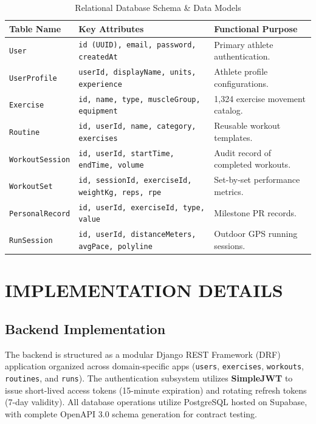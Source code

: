 \documentclass[12pt,a4paper]{report}
\begin{document}
\begin{table}[htbp]
\centering
\small
\renewcommand{\arraystretch}{1.25}
\begin{tabularx}{\textwidth}{|l|p{4.5cm}|X|}
\hline
\textbf{Table Name} & \textbf{Key Attributes} & \textbf{Functional Purpose} \\
\hline
\texttt{User} & \texttt{id (UUID), email, password, createdAt} & Primary athlete authentication. \\
\hline
\texttt{UserProfile} & \texttt{userId, displayName, units, experience} & Athlete profile configurations. \\
\hline
\texttt{Exercise} & \texttt{id, name, type, muscleGroup, equipment} & 1,324 exercise movement catalog. \\
\hline
\texttt{Routine} & \texttt{id, userId, name, category, exercises} & Reusable workout templates. \\
\hline
\texttt{WorkoutSession} & \texttt{id, userId, startTime, endTime, volume} & Audit record of completed workouts. \\
\hline
\texttt{WorkoutSet} & \texttt{id, sessionId, exerciseId, weightKg, reps, rpe} & Set-by-set performance metrics. \\
\hline
\texttt{PersonalRecord} & \texttt{id, userId, exerciseId, type, value} & Milestone PR records. \\
\hline
\texttt{RunSession} & \texttt{id, userId, distanceMeters, avgPace, polyline} & Outdoor GPS running sessions. \\
\hline
\end{tabularx}
\caption{Relational Database Schema \& Data Models}
\label{tab:db_schema}
\end{table}

\chapter{IMPLEMENTATION DETAILS}

\section{Backend Implementation}
The backend is structured as a modular Django REST Framework (DRF) application organized across domain-specific apps (\texttt{users}, \texttt{exercises}, \texttt{workouts}, \texttt{routines}, and \texttt{runs}). The authentication subsystem utilizes \textbf{SimpleJWT} to issue short-lived access tokens (15-minute expiration) and rotating refresh tokens (7-day validity). All database operations utilize PostgreSQL hosted on Supabase, with complete OpenAPI 3.0 schema generation for contract testing.
\end{document}
